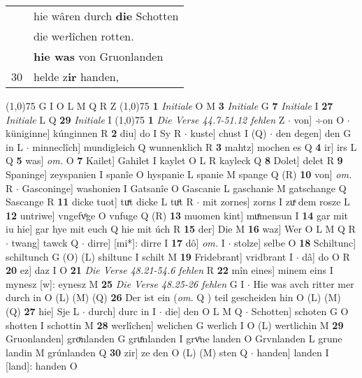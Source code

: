 \documentclass[8pt,a4paper,notitlepage]{article}
\begin{document}
\begin{table}[ht]
\begin{minipage}[t]{0.5\linewidth}
\begin{tabular}{rl}
 & hie wâren durch \textbf{die} Schotten\\ 
 & die we\textit{r}lîchen rotten.\\ 
 & \textbf{hie was} von Gruonlanden\\ 
30 & helde z\textbf{ir} handen,\\ 
\end{tabular}
\scriptsize
\line(1,0){75} \newline
G I O L M Q R Z \newline
\line(1,0){75} \newline
\textbf{1} \textit{Initiale} O M  \textbf{3} \textit{Initiale} G  \textbf{7} \textit{Initiale} I  \textbf{27} \textit{Initiale} L Q  \textbf{29} \textit{Initiale} I  \newline
\line(1,0){75} \newline
\textbf{1} \textit{Die Verse 44.7-51.12 fehlen} Z   $\cdot$ von] ÷on O  $\cdot$ küniginne] kúnginnen R \textbf{2} diu] do I Sy R  $\cdot$ kuste] chust I (Q)  $\cdot$ den degen] den G in L  $\cdot$ minneclîch] mundigleich Q wunnenklich R \textbf{3} mahtz] mochen es Q \textbf{4} ir] irs L Q \textbf{5} was] \textit{om.} O \textbf{7} Kailet] Gahilet I kaylet O L R kayleck Q \textbf{8} Dolet] delet R \textbf{9} Spaninge] zeyspanien I spanîe O hyspanie L spanie M spange Q (R) \textbf{10} von] \textit{om.} R  $\cdot$ Gasconinge] washonien I Gatsanîe O Gascanie L gaschanie M gatschange Q Sascange R \textbf{11} dicke tuot] tuͯt dicke L tuͦt R  $\cdot$ mit zornes] zorns I zuͯ dem rosze L \textbf{12} untriwe] vngefvͦge O vnfuge Q (R) \textbf{13} muomen kint] muͤmensun I \textbf{14} gar mit iu hie] gar hye mit euch Q hie mit úch R \textbf{15} der] Die M \textbf{16} waz] Wer O L M Q R  $\cdot$ twang] tawck Q  $\cdot$ dirre] [mi*]: dirre I \textbf{17} dô] \textit{om.} I  $\cdot$ stolze] selbe O \textbf{18} Schiltunc] schiltunch G (O) (L) shiltunc I schilt M \textbf{19} Fridebrant] vridbrant I  $\cdot$ dâ] do O R \textbf{20} ez] daz I O \textbf{21} \textit{Die Verse 48.21-54.6 fehlen} R  \textbf{22} mîn eines] minem eins I mynesz [w]: eynesz M \textbf{25} \textit{Die Verse 48.25-26 fehlen} G I   $\cdot$ Hie was avch ritter mer durch in O (L) (M) (Q) \textbf{26} Der ist ein (\textit{om.} Q ) teil gescheiden hin O (L) (M) (Q) \textbf{27} hie] Sje L  $\cdot$ durch] durc in I  $\cdot$ die] den O L M Q  $\cdot$ Schotten] schoten G O shotten I schottin M \textbf{28} werlîchen] welichen G werlich I O (L) wertlichin M \textbf{29} Gruonlanden] groͮnlanden G gruͤnlanden I grvͦne landen O Grvnlanden L grune landin M grúnlanden Q \textbf{30} zir] ze den O (L) (M) sten Q  $\cdot$ handen] landen I [land]: handen O \newline

\end{minipage}
\end{table}
\end{document}
